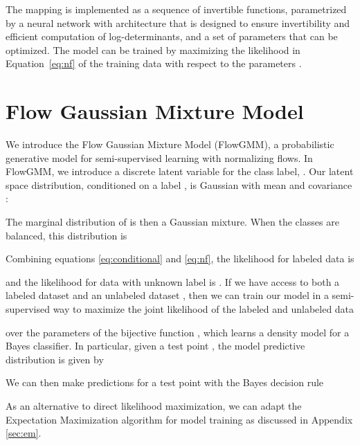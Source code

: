 \documentclass{article}
\newcommand{\method}{FlowGMM\xspace}
\begin{document}
The mapping  is implemented as a sequence of invertible functions, parametrized by a neural network with architecture
that is  designed to ensure invertibility and efficient computation 
of log-determinants, and a set of parameters  that can be optimized. The model can be trained by maximizing the likelihood in Equation~\eqref{eq:nf} of the training
data with respect to the parameters .

\section{Flow Gaussian Mixture Model}
\label{sec:sslnf}

We introduce the Flow Gaussian Mixture Model (FlowGMM), a probabilistic generative model for semi-supervised learning with normalizing flows.
In \method, we introduce a discrete latent variable  for the class label, . 
Our latent space distribution, conditioned on a label , is Gaussian with mean  and covariance :

The marginal distribution of  is then a Gaussian mixture. When the classes are balanced, this distribution is

Combining equations \eqref{eq:conditional}  and \eqref{eq:nf}, the likelihood for labeled data is 

and the likelihood for data with unknown label is .
If we have access to both a labeled dataset  and an unlabeled 
dataset , then we can train our model in a semi-supervised way to maximize the joint likelihood of the labeled and unlabeled data

over the parameters  of the bijective function , which learns a density model for a Bayes classifier. In particular, given a test point , the model predictive distribution is given by

We can then make predictions for a test point  with the Bayes decision rule 

As an alternative to direct likelihood maximization, we can adapt the Expectation Maximization algorithm for model training as discussed in Appendix \ref{sec:em}.
\end{document}
